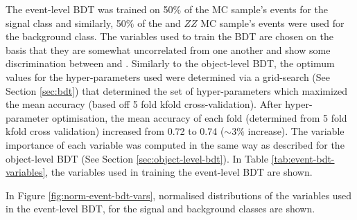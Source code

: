 The event-level BDT was trained on 50$\%$ of the \tWZ MC sample's events for the signal class and similarly, 50$\%$ of the \ttZ and $ZZ$ MC sample's events were used for the background class. The variables used to train the BDT are chosen on the basis that they are somewhat uncorrelated from one another and show some discrimination between \tWZ and \ttZ. Similarly to the object-level BDT, the optimum values for the hyper-parameters used were determined via a grid-search (See Section \ref{sec:bdt}) that determined the set of hyper-parameters which maximized the mean accuracy (based off 5 fold kfold cross-validation). After hyper-parameter optimisation, the mean accuracy of each fold (determined from 5 fold kfold cross validation) increased from 0.72 to 0.74 ($\sim 3\%$ increase). The variable importance of each variable was computed in the same way as described for the object-level BDT (See Section \ref{sec:object-level-bdt}). In Table \ref{tab:event-bdt-variables}, the variables used in training the event-level BDT are shown.
\begin{table}[htbp!]

\caption{A list of the variables used in the event-level BDT, ordered by variable importance (descending, top to bottom) is shown.}
	\label{tab:event-bdt-variables}
\end{table}

In Figure \ref{fig:norm-event-bdt-vars}, normalised distributions of the variables used in the event-level BDT, for the signal and background classes are shown.
    

